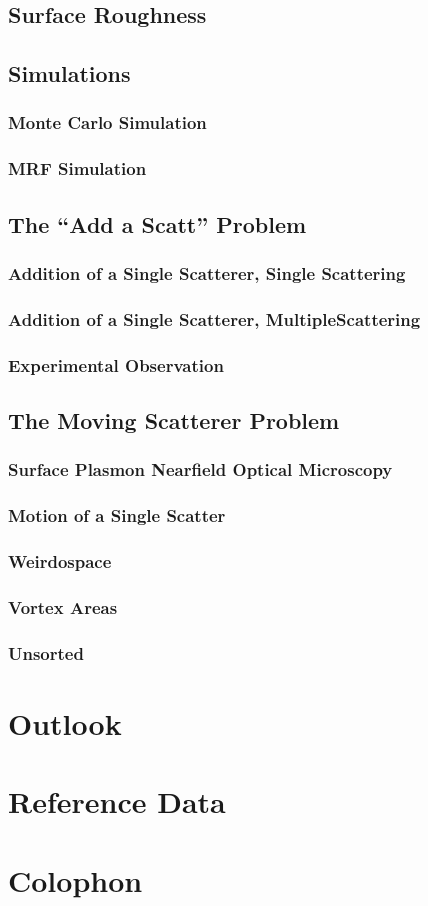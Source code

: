 \documentclass[a4paper,titlepage,onecolumn]{report}
\begin{document}
 \section{Surface Roughness}
 \section{Simulations}
  \subsection{Monte Carlo Simulation}
  \subsection{MRF Simulation}
 \section{The ``Add a Scatt'' Problem}
  \subsection{Addition of a Single Scatterer, Single Scattering}
  \subsection{Addition of a Single Scatterer, MultipleScattering}
  \subsection{Experimental Observation}
 \section{The Moving Scatterer Problem}
  \subsection{Surface Plasmon Nearfield Optical Microscopy}
  \subsection{Motion of a Single Scatter}
  \subsection{Weirdospace}
  \subsection{Vortex Areas}
  \subsection{Unsorted}

\chapter{Outlook} \label{ch:outlook}

\chapter{Reference Data} \label{ch:reference}
\chapter{Colophon}



\end{document}
